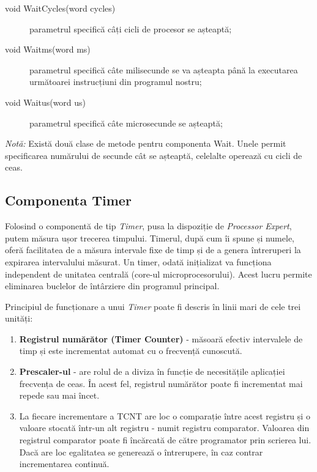 \begin{description}
    \item[void WaitCycles(word cycles)] parametrul specifică câți cicli de procesor se așteaptă;
    \item[void Waitms(word ms)] parametrul specifică câte milisecunde se va așteapta până la executarea următoarei instrucțiuni din programul nostru;
    \item[void Waitus(word us)] parametrul specifică câte microsecunde se așteaptă;
\end{description}

\textit{Notă:} Există două clase de metode pentru componenta Wait. Unele permit specificarea numărului de secunde cât se așteaptă, celelalte operează cu cicli de ceas.

\subsection{Componenta Timer}

Folosind o componentă de tip \textit{Timer}, pusa la dispoziție de \textit{Processor Expert}, putem măsura ușor trecerea timpului. Timerul, după cum îi spune și numele, oferă facilitatea de a măsura intervale fixe de timp și de a genera întreruperi la expirarea intervalului măsurat. Un timer, odată inițializat va funcționa independent de unitatea centrală (core-ul microprocesorului). Acest lucru permite eliminarea buclelor de întârziere din programul principal.

Principiul de funcționare a unui \textit{Timer} poate fi descris în linii mari de cele trei unități:

\begin{enumerate}
    \item \textbf{Registrul numărător (Timer Counter)} - măsoară efectiv intervalele de timp și este incrementat automat cu o frecvență cunoscută.
    \item \textbf{Prescaler-ul} - are rolul de a diviza în funcție de necesitățile aplicației frecvența de ceas. În acest fel, registrul numărător poate fi incrementat mai repede sau mai încet.
    \item La fiecare incrementare a TCNT are loc o comparație între acest registru și o valoare stocată într-un alt registru - numit registru comparator. Valoarea din registrul comparator poate fi încărcată de către programator prin scrierea lui. Dacă are loc egalitatea se generează o întrerupere, în caz contrar incrementarea continuă.
\end{enumerate}

